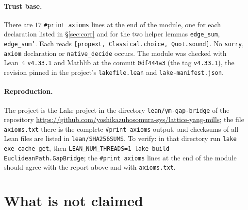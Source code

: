 \documentclass[11pt,a4paper]{article}
\theoremstyle{definition}
\theoremstyle{remark}
\newcommand{\code}[1]{\texttt{#1}}
\begin{document}
\paragraph{Trust base.}
{\sloppy There are $17$ \code{\#print axioms} lines at the end of the module, one for each declaration listed in \S\ref{sec:corr} and for the two helper lemmas \code{edge\_sum}, \code{edge\_sum'}.
Each reads \code{[propext, Classical.choice, Quot.sound]}.
No \code{sorry}, \code{axiom} declaration or \code{native\_decide} occurs.
The module was checked with Lean~4 \code{v4.33.1} and Mathlib at the commit \code{0df444a3} (the tag \code{v4.33.1}), the revision pinned in the project's \code{lakefile.lean} and \code{lake-\allowbreak{}manifest.json}.\par}

\paragraph{Reproduction.}
The project is the Lake project in the directory \code{lean/ym-gap-bridge} of the repository \url{https://github.com/yoshikazuhosomura-sys/lattice-yang-mills}; the file \code{axioms.txt} there is the complete \code{\#print axioms} output, and checksums of all Lean files are listed in \code{lean/SHA256SUMS}.
To verify: in that directory run \code{lake exe cache get}, then \code{LEAN\_NUM\_THREADS=1 lake build EuclideanPath.GapBridge}; the \code{\#print axioms} lines at the end of the module should agree with the report above and with \code{axioms.txt}.

\section{What is not claimed}\label{sec:notclaimed}
\end{document}
